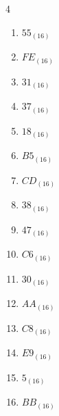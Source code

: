 \begin{multicols}{4}
\begin{enumerate}
  \item $55_{(16)}$

        \phantom{$=85$}

  \item $FE_{(16)}$

        \phantom{$=254$}

\columnbreak %

  \item $31_{(16)}$

        \phantom{$=49$}

  \item $37_{(16)}$

        \phantom{$=55$}

  \item $18_{(16)}$

        \phantom{$=24$}

  \item $B5_{(16)}$

        \phantom{$=181$}

  \item $CD_{(16)}$

        \phantom{$=205$}

  \item $38_{(16)}$

        \phantom{$=56$}

  \item $47_{(16)}$

        \phantom{$=71$}

  \item $C6_{(16)}$

        \phantom{$=198$}

  \item $30_{(16)}$

        \phantom{$=48$}

  \item $AA_{(16)}$

        \phantom{$=170$}

  \item $C8_{(16)}$

        \phantom{$=200$}

  \item $E9_{(16)}$

        \phantom{$=233$}

  \item $5_{(16)}$

        \phantom{$=5$}

  \item $BB_{(16)}$


\end{enumerate}
\end{multicols}
